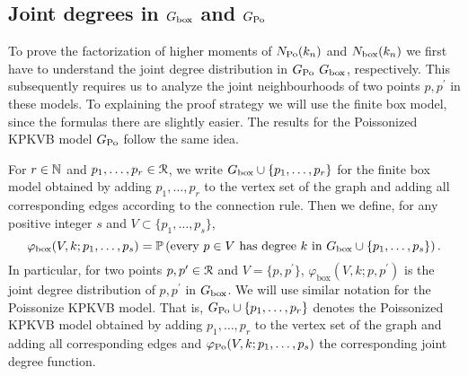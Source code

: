\subsection{Joint degrees in $G_{\mathrm{box}}$ and $G_{{\mathrm{Po}}}$}\label{ssec:joint_degrees_GPo}

To prove the factorization of higher moments of $N_{{\mathrm{Po}}}(k_n)$ and $N_{\text{box}}(k_n)$ we first have to understand the joint degree distribution in $G_{{\mathrm{Po}}}$ $G_{\mathrm{box}}$, respectively. This subsequently requires us to analyze the joint neighbourhoods of two points $p, p^\prime$ in these models. To explaining the proof strategy we will use the finite box model, since the formulas there are slightly easier. The results for the Poissonized KPKVB model $G_{{\mathrm{Po}}}$ follow the same idea.

%
%

For $r\in \mathbb{N}$ and $p_1, \dots, p_r \in {\mathcal R}$, we write $G_{\mathrm{box}}\cup \{p_1,\dots,p_r\}$ for the finite box model obtained by adding $p_1,\dots,p_r$ to the vertex set of the graph and adding all corresponding edges according to the connection rule. Then we define, for any positive integer $s$ and $V \subset \{p_1,\dots,p_s\}$,
\begin{equation}\label{eq:def_joint_degree_distribution}
\varphi_{\mathrm{box}}(V, k ; p_1,\dots,p_s) = \mathbb{P}\left(\text{every }p\in V\text{ has degree }k\text{ in }G_{\mathrm{box}} \cup \{p_1,\dots,p_s\}\right).
\end{equation}
In particular, for two points $p, p^\prime \in {\mathcal R}$ and $V = \{p,p^\prime\}$, $\varphi_{\mathrm{box}}(V, k ;p,p^\prime)$ is the joint degree distribution of $p, p^\prime $ in $G_{\mathrm{box}}$. We will use similar notation for the Poissonize KPKVB model. That is, $G_{{\mathrm{Po}}} \cup \{p_1,\dots,p_r\}$ denotes the Poissonized KPKVB model obtained by adding $p_1,\dots,p_r$ to the vertex set of the graph and adding all corresponding edges and $\varphi_{{\mathrm{Po}}}(V, k ; p_1,\dots,p_s)$ the corresponding joint degree function.


